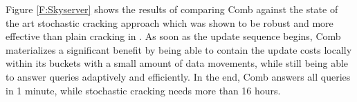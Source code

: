 Figure \ref{F:Skyserver} shows the results of comparing Comb against the state of the art 
stochastic cracking approach which was shown to be robust and more effective than plain cracking in \cite{StochasticCracking}. 
As soon as the update sequence begins, Comb materializes a significant benefit by being able to contain the update costs locally within its buckets with a small amount of data movements, 
while still being able to answer queries adaptively and efficiently.
In the end, Comb answers all queries in 1 minute, while stochastic cracking needs more than 16 hours.


\begin{figure}[t]
\hspace{-1em}%
\hfill
{}
\end{figure}
